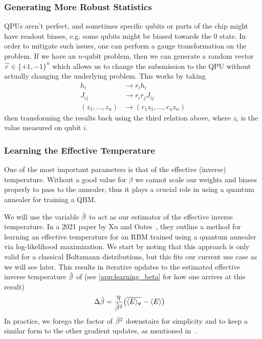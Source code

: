 \subsubsection{Generating More Robust Statistics}
QPUs aren't perfect, and sometimes specific qubits or parts of the chip might have readout biases, e.g. some qubits might be biased towards the 0 state.
In order to mitigate such issues, one can perform a gauge transformation on the problem.
If we have an \( n \)-qubit problem, then we can generate a random vector \( \vec{r} \in \{+1, -1\}^n \) which allows us to change the subsmission to the QPU without actually changing the underlying problem.
This works by taking
\begin{align}
    h_i
        &\rightarrow r_i h_i \\
    J_{ij}
        &\rightarrow r_i r_j J_{ij} \\
    (z_1, \dots, z_n)
        &\rightarrow (r_1 z_1, \dots, r_n z_n)
\end{align}
then transforming the results back using the third relation above, where \( z_i \) is the value measured on qubit \( i \).

\subsubsection{Learning the Effective Temperature}\label{sec:learning_beta}
One of the most important parameters is that of the effective (inverse) temperature.
Without a good value for \( \beta \) we cannot scale our weights and biases properly to pass to the annealer, thus it plays a crucial role in using a quantum annealer for training a QBM.

We will use the variable \( \hat{\beta} \) to act as our estimator of the effective inverse temperature.
In a 2021 paper by Xu and Oates~\cite{xu_2021}, they outline a method for learning an effective temperature for an RBM trained using a quantum annealer via log-likelihood maximization.
We start by noting that this approach is only valid for a classical Boltzmann distributions, but this fits our current use case as we will see later.
This results in iterative updates to the estimated effective inverse temperature \( \hat{\beta} \) of (see \cref{app:learning_beta} for how one arrives at this result)
\begin{align}
    \Delta\hat{\beta}
        &= \frac{\eta}{\hat{\beta}^2}\big(\overline{\langle E \rangle_{\mathbf{v}}} - \langle E \rangle\big)
\end{align}
In practice, we forego the factor of \( \hat{\beta}^2 \) downstairs for simplicity and to keep a similar form to the other gradient updates, as mentioned in~\cite{xu_2021}.

